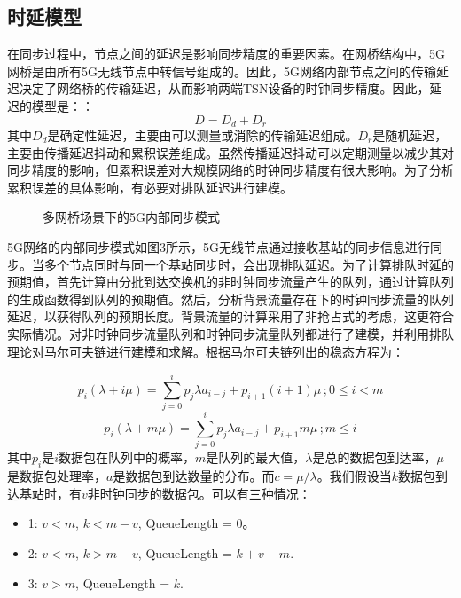 \documentclass[UTF8,a4paper,12pt]{ctexart}
\numberwithin{equation}{section}
\begin{document}
\subsection{时延模型}
在同步过程中，节点之间的延迟是影响同步精度的重要因素。在网桥结构中，5G网桥是由所有5G无线节点中转信号组成的。因此，5G网络内部节点之间的传输延迟决定了网络桥的传输延迟，从而影响两端TSN设备的时钟同步精度。因此，延迟的模型是：：
\begin{equation}
	D=D_d+D_r
\end{equation}
其中$D_d$是确定性延迟，主要由可以测量或消除的传输延迟组成。$D_r$是随机延迟，主要由传播延迟抖动和累积误差组成。虽然传播延迟抖动可以定期测量以减少其对同步精度的影响，但累积误差对大规模网络的时钟同步精度有很大影响。为了分析累积误差的具体影响，有必要对排队延迟进行建模。
\begin{figure}[htb] 
	\caption{多网桥场景下的5G内部同步模式}
\end{figure}
5G网络的内部同步模式如图3所示，5G无线节点通过接收基站的同步信息进行同步。当多个节点同时与同一个基站同步时，会出现排队延迟。为了计算排队时延的预期值，首先计算由分批到达交换机的非时钟同步流量产生的队列，通过计算队列的生成函数得到队列的预期值。然后，分析背景流量存在下的时钟同步流量的队列延迟，以获得队列的预期长度。背景流量的计算采用了非抢占式的考虑，这更符合实际情况。对非时钟同步流量队列和时钟同步流量队列都进行了建模，并利用排队理论对马尔可夫链进行建模和求解。根据马尔可夫链列出的稳态方程为：

\begin{equation*}
	p_i\left( \lambda +i \mu \right) =\sum_{j=0}^i{p_j \lambda  a_{i-j}+p_{i+1}\left( i+1 \right)  \mu\, ; 0\leqslant i<m}
\end{equation*}
\begin{equation}
	p_i\left( \lambda +m \mu \right) =\sum_{j=0}^i{p_j \lambda  a_{i-j}+p_{i+1}m \mu}\,; m\leqslant i
\end{equation}
其中$p_i$是$i$数据包在队列中的概率，$m$是队列的最大值，$\lambda$是总的数据包到达率，$\mu$是数据包处理率，$a$是数据包到达数量的分布。而$c=\mu/\lambda $。我们假设当$k$数据包到达基站时，有$v$非时钟同步的数据包。可以有三种情况：
\begin{itemize}
	\item 1: $v<m$, $k<m-v$, QueueLength = 0。
	\item 2: $v<m$, $k>m-v$, QueueLength = $k+v-m$.
	\item 3: $v>m$, QueueLength = $k$.
\end{itemize}
\end{document}
